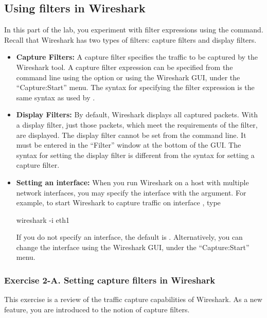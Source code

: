 
\newpage
\subsection{Using filters in Wireshark}

In this part of the lab, you experiment with filter expressions using the  command. Recall that Wireshark has two types of filters: capture filters and display filters.

\begin{itemize}
	\item{\textbf{Capture Filters:}} A capture filter specifies the traffic to be captured by the Wireshark tool. A capture filter expression can be specified from the command line using the  option or using the Wireshark GUI, under the ``Capture:Start'' menu. The syntax for specifying the filter expression is the same syntax as used by .
	\item{\textbf{Display Filters:}} By default, Wireshark displays all captured packets. With a display filter, just those packets, which meet the requirements of the filter, are displayed. The display filter cannot be set from the command line. It must be entered in the ``Filter'' window at the bottom of the GUI. The syntax for setting the display filter is different from the syntax for setting a capture filter.
	\item{\textbf{Setting an interface:}} When you run Wireshark on a host with multiple network interfaces, you may specify the interface with the  argument. For example, to start Wireshark to capture traffic on interface , type
		\begin{cmdblock}
	wireshark -i eth1
		\end{cmdblock}		
		If you do not specify an interface, the default is . Alternatively, you can change the interface using the Wireshark GUI, under the ``Capture:Start'' menu.
\end{itemize}

\subsubsection*{Exercise 2-A. Setting capture filters in Wireshark}
This exercise is a review of the traffic capture capabilities of Wireshark. As a new feature, you are introduced to the notion of capture filters.

